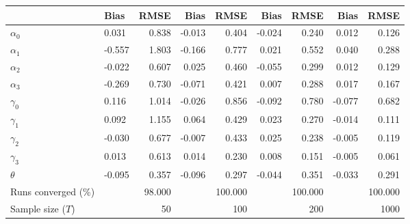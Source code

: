 
\begin{tabular}[t]{llrrrrrrr}
\toprule
  & Bias & RMSE & Bias & RMSE & Bias & RMSE & Bias & RMSE\\
\midrule
$\alpha_{0}$ & 0.031 & 0.838 & -0.013 & 0.404 & -0.024 & 0.240 & 0.012 & 0.126\\
$\alpha_{1}$ & -0.557 & 1.803 & -0.166 & 0.777 & 0.021 & 0.552 & 0.040 & 0.288\\
$\alpha_{2}$ & -0.022 & 0.607 & 0.025 & 0.460 & -0.055 & 0.299 & 0.012 & 0.129\\
$\alpha_{3}$ & -0.269 & 0.730 & -0.071 & 0.421 & 0.007 & 0.288 & 0.017 & 0.167\\
$\gamma_{0}$ & 0.116 & 1.014 & -0.026 & 0.856 & -0.092 & 0.780 & -0.077 & 0.682\\
$\gamma_{1}$ & 0.092 & 1.155 & 0.064 & 0.429 & 0.023 & 0.270 & -0.014 & 0.111\\
$\gamma_{2}$ & -0.030 & 0.677 & -0.007 & 0.433 & 0.025 & 0.238 & -0.005 & 0.119\\
$\gamma_{3}$ & 0.013 & 0.613 & 0.014 & 0.230 & 0.008 & 0.151 & -0.005 & 0.061\\
$\theta$ & -0.095 & 0.357 & -0.096 & 0.297 & -0.044 & 0.351 & -0.033 & 0.291\\
Runs converged (\%) &  & 98.000 &  & 100.000 &  & 100.000 &  & 100.000\\
Sample size ($T$) &  & 50 &  & 100 &  & 200 &  & 1000\\
\bottomrule
\end{tabular}

